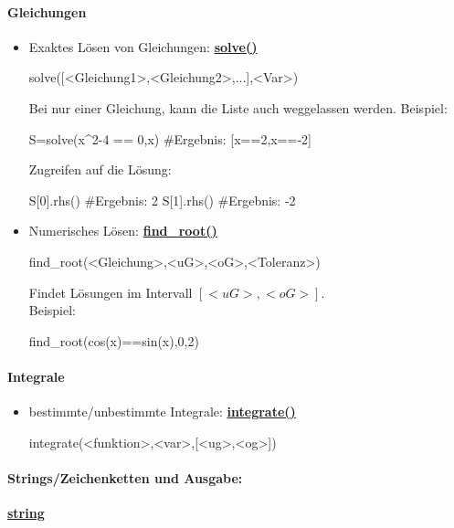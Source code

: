 \documentclass[a4paper,9pt,DIV15,twocolumn]{scrartcl}
\begin{document}
{\paragraph{Gleichungen}
\begin{itemize}
 \item Exaktes Lösen von Gleichungen: \href{https://sage.math.uni-goettingen.de/doc/static/reference/calculus/sage/symbolic/relation.html#sage.symbolic.relation.solve}{\textbf{solve()}}
  \begin{sageinsmall}
solve([<Gleichung1>,<Gleichung2>,...],<Var>)
\end{sageinsmall}
Bei nur einer Gleichung, kann die Liste auch weggelassen werden. Beispiel:
  \begin{sageinsmall}
S=solve(x^2-4 == 0,x) #Ergebnis: [x==2,x==-2]
\end{sageinsmall}
Zugreifen auf die Lösung:
  \begin{sageinsmall}
S[0].rhs() #Ergebnis: 2
S[1].rhs() #Ergebnis: -2
\end{sageinsmall}
\item Numerisches Lösen: \href{https://sage.math.uni-goettingen.de/doc/static/reference/numerical/sage/numerical/optimize.html#sage.numerical.optimize.find_root}{\textbf{find\_root()}}

   \begin{sageinsmall}
find_root(<Gleichung>,<uG>,<oG>,<Toleranz>)
\end{sageinsmall}
Findet Lösungen im Intervall  $[<uG>,<oG>]$.\\
Beispiel:
  \begin{sageinsmall}
find_root(cos(x)==sin(x),0,2)
\end{sageinsmall}
\end{itemize}

\paragraph{Integrale}
\begin{itemize}
\item bestimmte/unbestimmte Integrale: \href{https://sage.math.uni-goettingen.de/doc/static/reference/sage/calculus/functional.html?highlight=diff#sage.calculus.functional.integral}{\textbf{integrate()}}
\begin{sageinsmall}
integrate(<funktion>,<var>,[<ug>,<og>]) 
\end{sageinsmall}
\end{itemize}

\paragraph{Strings/Zeichenketten und Ausgabe:}\href{http://docs.python.org/library/string.html?highlight=string.replace#string-constants}{\textbf{string}}

}
\end{document}
